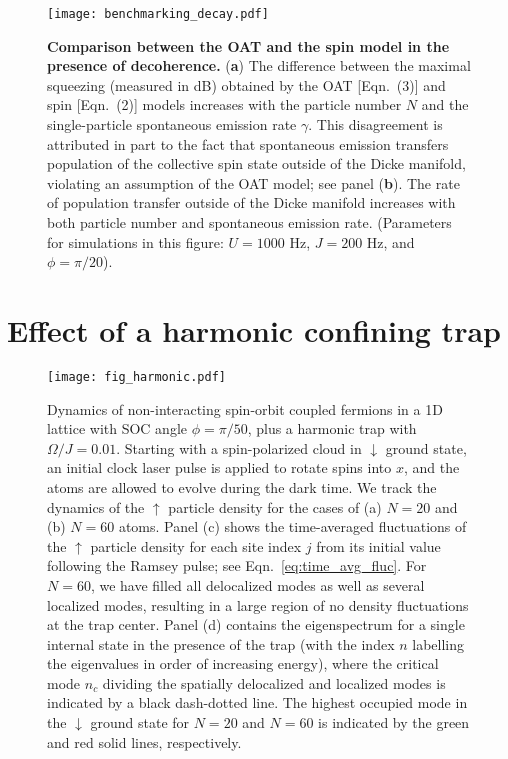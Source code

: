 \documentclass{nature}
\begin{document}
\begin{spacing}{1}
\begin{figure}
\centering
\texttt{[image: benchmarking\_decay.pdf]}
\caption{{\bf Comparison between the OAT and the spin model in the presence of decoherence.}
({\bf a}) The difference between the maximal squeezing (measured in dB) obtained by the OAT [Eqn.~(3)] and spin [Eqn.~(2)] models increases with the particle number $N$ and the single-particle spontaneous emission rate $\gamma$.
This disagreement is attributed in part to the fact that spontaneous emission transfers population of the collective spin state outside of the Dicke manifold, violating an assumption of the OAT model; see panel ({\bf b}).
The rate of population transfer outside of the Dicke manifold increases with both particle number and spontaneous emission rate.
(Parameters for simulations in this figure: $U=1000$ Hz, $J=200$ Hz, and $\phi=\pi/20$).
}
\label{fig:benchmarking_decay}
\end{figure}
\end{spacing}


\section*{Effect of a harmonic confining trap}

\begin{spacing}{1}
\begin{figure}
\centering
    \texttt{[image: fig\_harmonic.pdf]}
    \label{fig:harmonic_trap1}
    \caption{Dynamics of non-interacting spin-orbit coupled fermions in a 1D lattice with SOC angle $\phi = \pi/50$, plus a harmonic trap with $\Omega/J = 0.01$. Starting with a spin-polarized cloud in $\downarrow$ ground state, an initial clock laser pulse is applied to rotate spins into $x$, and the atoms are allowed to evolve during the dark time. We track the dynamics of the $\uparrow$ particle density for the cases of (a) $N = 20$ and (b) $N = 60$ atoms. Panel (c) shows the time-averaged fluctuations of the $\uparrow$ particle density for each site index $j$ from its initial value following the Ramsey pulse; see Eqn.~\eqref{eq:time_avg_fluc}. For $N = 60$, we have filled all delocalized modes as well as several localized modes, resulting in a large region of no density fluctuations at the trap center. Panel (d) contains the eigenspectrum for a single internal state in the presence of the trap (with the index $n$ labelling the eigenvalues in order of increasing energy), where the critical mode $n_c$ dividing the spatially delocalized and localized modes is indicated  by a black dash-dotted line. The highest occupied mode in the $\downarrow$ ground state for $N = 20$ and $N = 60$ is indicated by the green and red solid lines, respectively.} 
    \label{fig:harmonic_trap}
\end{figure}
\end{spacing}
\end{document}
